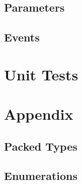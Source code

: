 

\subsection{Parameters}



\subsection{Events}



\section{Unit Tests}



\section{Appendix}
\subsection{Packed Types}



\subsection{Enumerations}




